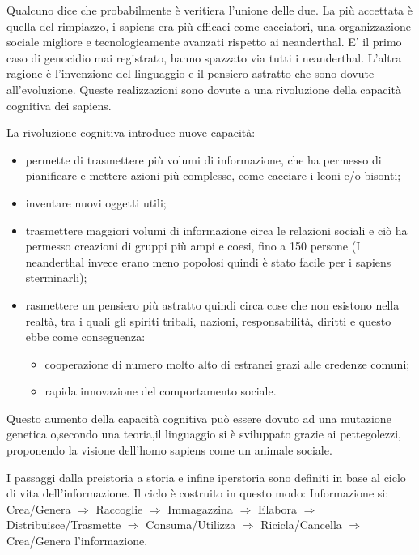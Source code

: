 \documentclass[]{article}
\begin{document}
Qualcuno dice che probabilmente è veritiera l'unione delle due.
La più accettata è quella del rimpiazzo, i sapiens era più efficaci
come cacciatori, una organizzazione sociale migliore e tecnologicamente
avanzati rispetto ai neanderthal. E' il primo caso di genocidio mai
registrato, hanno spazzato via tutti i neanderthal. L'altra ragione è
l'invenzione del linguaggio e il pensiero astratto che sono dovute
all'evoluzione. Queste realizzazioni sono dovute a una rivoluzione della
capacità cognitiva dei sapiens.

La rivoluzione cognitiva introduce nuove capacità:

\begin{itemize}
	\item
	permette di trasmettere più volumi di informazione, che ha permesso di
	pianificare e mettere azioni più complesse, come cacciare i leoni e/o
	bisonti;
	\item
	inventare nuovi oggetti utili;
	\item
	trasmettere maggiori volumi di informazione circa le relazioni sociali
	e ciò ha permesso creazioni di gruppi più ampi e coesi, fino a 150
	persone (I neanderthal invece erano meno popolosi quindi è stato
	facile per i sapiens sterminarli);
	\item
	rasmettere un pensiero più astratto quindi circa cose che non
	esistono nella realtà, tra i quali gli spiriti tribali, nazioni,
	responsabilità, diritti e questo ebbe come conseguenza:
	
	\begin{itemize}
		 
		\item
		cooperazione di numero molto alto di estranei grazi alle credenze
		comuni;
		\item
		rapida innovazione del comportamento sociale.
	\end{itemize}
\end{itemize}

Questo aumento della capacità cognitiva può essere dovuto ad una mutazione genetica
o,secondo una teoria,il linguaggio si è sviluppato grazie ai pettegolezzi,
proponendo la visione dell'homo sapiens come un animale sociale.



I passaggi dalla preistoria a storia e infine iperstoria sono definiti
in base al ciclo di vita dell'informazione. Il ciclo è costruito in
questo modo: Informazione si: Crea/Genera $\Rightarrow$ Raccoglie $\Rightarrow$ Immagazzina $\Rightarrow$
Elabora $\Rightarrow$ Distribuisce/Trasmette $\Rightarrow$ Consuma/Utilizza $\Rightarrow$ Ricicla/Cancella $\Rightarrow$
Crea/Genera l'informazione.
\end{document}
